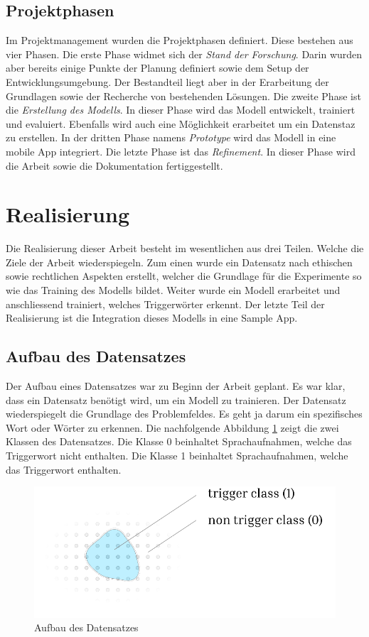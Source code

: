 \documentclass[11pt,a4paper]{article}
\begin{document}
\subsection{Projektphasen}
Im Projektmanagement wurden die Projektphasen definiert. Diese bestehen aus vier Phasen. Die erste
Phase widmet sich der \textit{Stand der Forschung}. Darin wurden aber bereits einige Punkte der 
Planung definiert sowie dem Setup der Entwicklungsumgebung. Der Bestandteil liegt aber in der 
Erarbeitung der Grundlagen sowie der Recherche von bestehenden Lösungen. Die zweite Phase ist die 
\textit{Erstellung des Modells}. In dieser Phase wird das Modell entwickelt, trainiert und 
evaluiert. Ebenfalls wird auch eine Möglichkeit erarbeitet um ein Datenstaz zu erstellen. In der 
dritten Phase namens \textit{Prototype} wird das Modell in eine mobile App integriert. 
Die letzte Phase ist das \textit{Refinement}. In dieser Phase wird die Arbeit sowie die
Dokumentation fertiggestellt. 


\newpage \section{Realisierung}
Die Realisierung dieser Arbeit besteht im wesentlichen aus drei Teilen. Welche die Ziele der Arbeit 
wiederspiegeln. Zum einen wurde ein Datensatz nach ethischen sowie rechtlichen Aspekten erstellt, 
welcher die Grundlage für die Experimente so wie das Training des Modells bildet. Weiter wurde ein 
Modell erarbeitet und anschliessend trainiert, welches Triggerwörter erkennt. Der letzte Teil der 
Realisierung ist die Integration dieses Modells in eine Sample App.

\subsection{Aufbau des Datensatzes}
Der Aufbau eines Datensatzes war zu Beginn der Arbeit geplant. Es war klar, dass ein Datensatz 
benötigt wird, um ein Modell zu trainieren. Der Datensatz wiederspiegelt die Grundlage des 
Problemfeldes. Es geht ja darum ein spezifisches Wort oder Wörter zu erkennen. Die nachfolgende 
Abbildung \ref{fig:dataset} zeigt die zwei Klassen des Datensatzes. Die Klasse 0 beinhaltet 
Sprachaufnahmen, welche das Triggerwort nicht enthalten. Die Klasse 1 beinhaltet Sprachaufnahmen, 
welche das Triggerwort enthalten.

\hspace*{-1.5cm}
\begin{figure}[h]
	\centering
	\includegraphics[width=0.75\linewidth]{img/dataset.pdf}
	\caption{Aufbau des Datensatzes}
	\label{fig:dataset} 
\end{figure}
\end{document}
